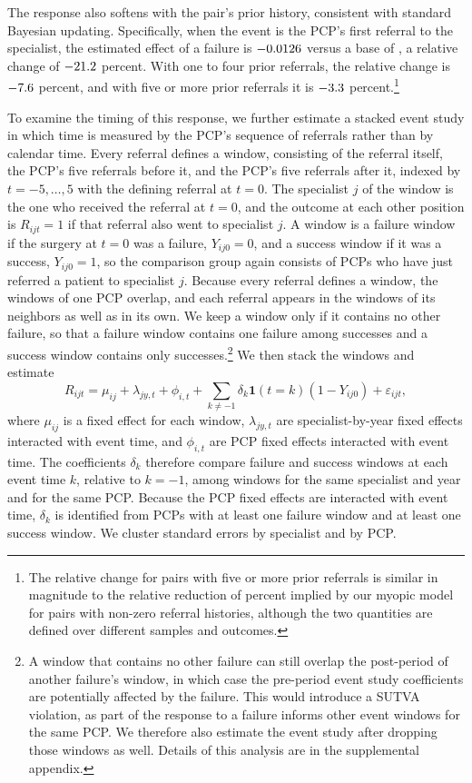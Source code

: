 \documentclass[12pt]{article}
\begin{document}
The response also softens with the pair's prior history, consistent with standard Bayesian updating. Specifically, when the event is the PCP's first referral to the specialist, the estimated effect of a failure is $-0.0126{}$ versus a base of \rereferBasehistzero{}, a relative change of $-21.2{}$ percent. With one to four prior referrals, the relative change is $-7.6{}$ percent, and with five or more prior referrals it is $-3.3{}$ percent.\footnote{The relative change for pairs with five or more prior referrals is similar in magnitude to the relative reduction of \partialFXRelativeMyopic{} percent implied by our myopic model for pairs with non-zero referral histories, although the two quantities are defined over different samples and outcomes.}

To examine the timing of this response, we further estimate a stacked event study in which time is measured by the PCP's sequence of referrals rather than by calendar time. Every referral defines a window, consisting of the referral itself, the PCP's five referrals before it, and the PCP's five referrals after it, indexed by $t=-5,\ldots,5$ with the defining referral at $t=0$. The specialist $j$ of the window is the one who received the referral at $t=0$, and the outcome at each other position is $R_{ijt}=1$ if that referral also went to specialist $j$. A window is a failure window if the surgery at $t=0$ was a failure, $Y_{ij0}=0$, and a success window if it was a success, $Y_{ij0}=1$, so the comparison group again consists of PCPs who have just referred a patient to specialist $j$. Because every referral defines a window, the windows of one PCP overlap, and each referral appears in the windows of its neighbors as well as in its own. We keep a window only if it contains no other failure, so that a failure window contains one failure among successes and a success window contains only successes.\footnote{A window that contains no other failure can still overlap the post-period of another failure's window, in which case the pre-period event study coefficients are potentially affected by the failure. This would introduce a SUTVA violation, as part of the response to a failure informs other event windows for the same PCP. We therefore also estimate the event study after dropping those windows as well. Details of this analysis are in the supplemental appendix.} We then stack the windows and estimate
\begin{equation}
  R_{ijt} = \mu_{ij} + \lambda_{j y, t} + \phi_{i, t} + \sum_{k \neq -1} \delta_k \mathbf{1}(t=k) (1-Y_{ij0}) + \varepsilon_{ijt},
  \label{eqn:rereferral_es}
\end{equation}
where $\mu_{ij}$ is a fixed effect for each window, $\lambda_{jy,t}$ are specialist-by-year fixed effects interacted with event time, and $\phi_{i,t}$ are PCP fixed effects interacted with event time. The coefficients $\delta_k$ therefore compare failure and success windows at each event time $k$, relative to $k=-1$, among windows for the same specialist and year and for the same PCP. Because the PCP fixed effects are interacted with event time, $\delta_k$ is identified from PCPs with at least one failure window and at least one success window. We cluster standard errors by specialist and by PCP.
\end{document}
